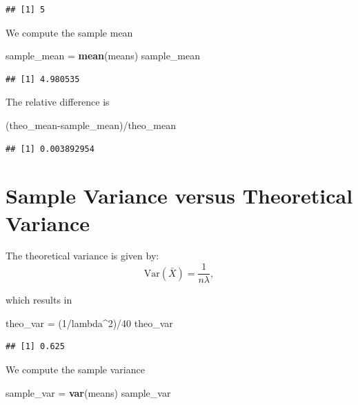 \documentclass[]{article}
\newenvironment{Shaded}{\begin{snugshade}}{\end{snugshade}}
\newcommand{\KeywordTok}[1]{\textcolor[rgb]{0.13,0.29,0.53}{\textbf{{#1}}}}
\newcommand{\DecValTok}[1]{\textcolor[rgb]{0.00,0.00,0.81}{{#1}}}
\newcommand{\StringTok}[1]{\textcolor[rgb]{0.31,0.60,0.02}{{#1}}}
\newcommand{\NormalTok}[1]{{#1}}
\begin{document}
\begin{verbatim}
## [1] 5
\end{verbatim}

We compute the sample mean

\begin{Shaded}
\begin{Highlighting}[]
\NormalTok{sample_mean =}\StringTok{ }\KeywordTok{mean}\NormalTok{(means)}
\NormalTok{sample_mean}
\end{Highlighting}
\end{Shaded}

\begin{verbatim}
## [1] 4.980535
\end{verbatim}

The relative difference is

\begin{Shaded}
\begin{Highlighting}[]
\NormalTok{(theo_mean-sample_mean)/theo_mean}
\end{Highlighting}
\end{Shaded}

\begin{verbatim}
## [1] 0.003892954
\end{verbatim}

\section{Sample Variance versus Theoretical Variance}

The theoretical variance is given by: \[
\mbox{Var}\left(\bar{X}\right) = \frac{1}{n\lambda},
\]

which results in

\begin{Shaded}
\begin{Highlighting}[]
\NormalTok{theo_var =}\StringTok{ }\NormalTok{(}\DecValTok{1}\NormalTok{/lambda^}\DecValTok{2}\NormalTok{)/}\DecValTok{40}
\NormalTok{theo_var}
\end{Highlighting}
\end{Shaded}

\begin{verbatim}
## [1] 0.625
\end{verbatim}

We compute the sample variance

\begin{Shaded}
\begin{Highlighting}[]
\NormalTok{sample_var =}\StringTok{ }\KeywordTok{var}\NormalTok{(means)}
\NormalTok{sample_var}
\end{Highlighting}
\end{Shaded}
\end{document}
